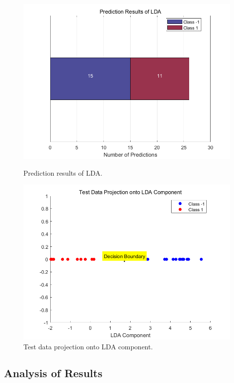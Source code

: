 \documentclass[12pt, onecolumn]{article}
\begin{document}
\begin{figure}[htbp]
\centering
\begin{minipage}[b]{0.48\linewidth}
\includegraphics[width=\linewidth]{LDA2.png}
\caption{Prediction results of LDA.}
\label{fig:lda_results}
\end{minipage}
\hfill
\begin{minipage}[b]{0.48\linewidth}
\includegraphics[width=\linewidth]{untitled111.png}
\caption{Test data projection onto LDA component.}
\label{fig:lda_projection}
\end{minipage}
\end{figure}



\subsection{Analysis of Results}
\end{document}
